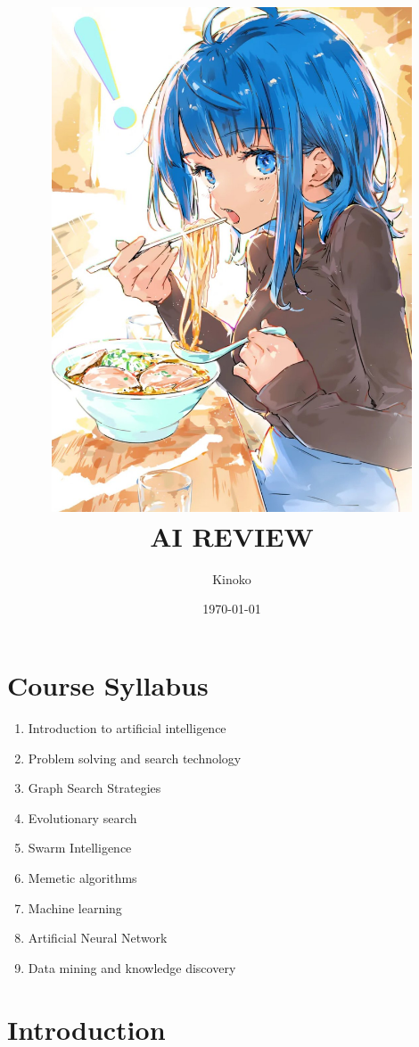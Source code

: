 \documentclass[a4paper, 12pt]{article}
\title{
    \includegraphics[width=0.8\textwidth]{Yanami.JPG}\\  %
    AI REVIEW
}
\author{Kinoko}
\date{\today}
\begin{document}

\begin{titlepage}  
    \maketitle
\end{titlepage}

\fancyhead[R]{}  %

\tableofcontents
\newpage  %


\section*{Course Syllabus}  %
    \begin{enumerate}
        \item Introduction to artificial intelligence
        \item Problem solving and search technology
        \item Graph Search Strategies
        \item Evolutionary search
        \item Swarm Intelligence
        \item Memetic algorithms 
        \item Machine learning
        \item Artificial Neural Network
        \item Data mining and knowledge discovery
    \end{enumerate}

\newpage

\setcounter{section}{0}

\section{Introduction}
\end{document}

